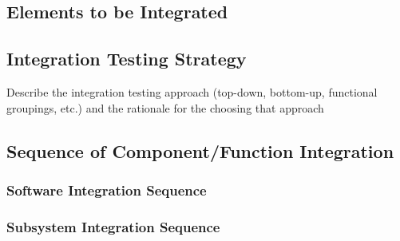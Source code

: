 \documentclass{article}
\begin{document}
\subsection{Elements to be Integrated}
\subsection{Integration Testing Strategy}
Describe the integration testing approach (top-down, bottom-up, functional groupings, etc.) and the rationale for the choosing that approach
\subsection{Sequence of Component/Function Integration}
\subsubsection{Software Integration Sequence}
\subsubsection{Subsystem Integration Sequence}
\end{document}
